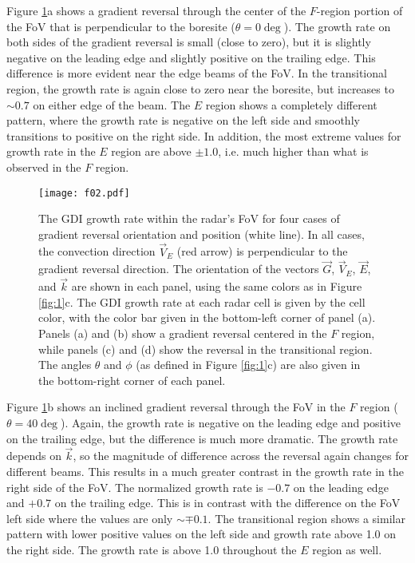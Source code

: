 Figure \ref{fig:2}a shows a gradient reversal through the center of the \(F\)-region portion of the FoV that is perpendicular to the boresite (\(\theta=0\deg\)).  The growth rate on both sides of the gradient reversal is small (close to zero), but it is slightly negative on the leading edge and slightly positive on the trailing edge. This difference is more evident near the edge beams of the FoV.  In the transitional region, the growth rate is again close to zero near the boresite, but increases to \(\sim0.7\) on either edge of the beam.  The \(E\) region shows a completely different pattern, where the growth rate is negative on the left side and smoothly transitions to positive on the right side.  In addition, the most extreme values for growth rate in the \(E\) region are above \(\pm1.0\), i.e. much higher than what is observed in the \(F\) region.

\begin{figure}
	\texttt{[image: f02.pdf]}
	\caption[GDI growth rate within radar FoV]{The GDI growth rate within the radar's FoV for four cases of gradient reversal orientation and position (white line).  In all cases, the convection direction \(\vec{V}_E\) (red arrow) is perpendicular to the gradient reversal direction.  The orientation of the vectors \(\vec{G}\), \(\vec{V}_E\), \(\vec{E}\), and \(\vec{k}\) are shown in each panel, using the same colors as in Figure \ref{fig:1}c.  The GDI growth rate at each radar cell is given by the cell color, with the color bar given in the bottom-left corner of panel (a). Panels (a) and (b) show a gradient reversal centered in the \(F\) region, while panels (c) and (d) show the reversal in the transitional region.  The angles \(\theta\) and \(\phi\) (as defined in Figure \ref{fig:1}c) are also given in the bottom-right corner of each panel.}
	\label{fig:2}
\end{figure}

Figure \ref{fig:2}b shows an inclined gradient reversal through the FoV in the \(F\) region (\(\theta=40\deg\)). Again, the growth rate is negative on the leading edge and positive on the trailing edge, but the difference is much more dramatic.  The growth rate depends on \(\vec{k}\), so the magnitude of difference across the reversal again changes for different beams. This results in a much greater contrast in the growth rate in the right side of the FoV. The normalized growth rate is \(-0.7\) on the leading edge and \(+0.7\) on the trailing edge. This is in contrast with the difference on the FoV left side where the values are only \(\sim\mp0.1\).  The transitional region shows a similar pattern with lower positive values on the left side and growth rate above 1.0 on the right side.  The growth rate is above 1.0 throughout the \(E\) region as well.

